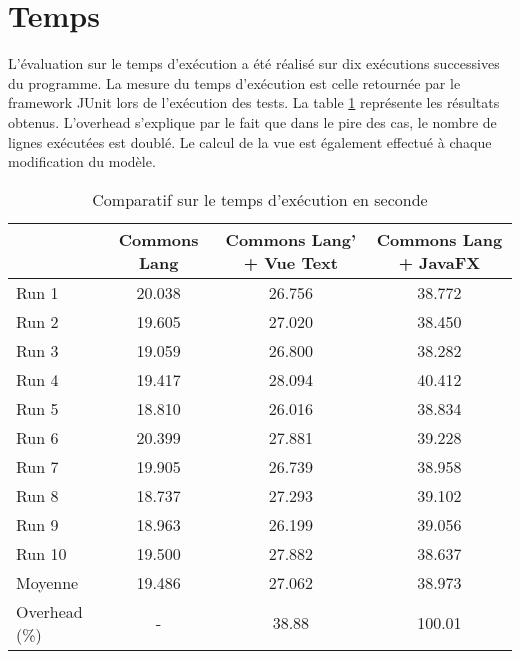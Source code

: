 \section{Temps}
\label{temps}

L'évaluation sur le temps d'exécution a été réalisé sur dix exécutions successives du programme. La mesure du temps d'exécution est celle retournée par le framework JUnit lors de l'exécution des tests. La table \ref{evaluation_temps} représente les résultats obtenus. L'overhead s'explique par le fait que dans le pire des cas, le nombre de lignes exécutées est doublé. Le calcul de la vue est également effectué à chaque modification du modèle.

\begin{table}[H]
\centering
\begin{tabular}{|l|c|c|c|}
\hline
         & Commons Lang & Commons Lang' + Vue Text & Commons Lang + JavaFX\\
         \hline
Run 1     & 20.038  & 26.756       & 38.772        \\
Run 2     & 19.605  & 27.020       & 38.450        \\
Run 3     & 19.059  & 26.800       & 38.282        \\
Run 4     & 19.417  & 28.094       & 40.412        \\
Run 5     & 18.810  & 26.016       & 38.834        \\
Run 6     & 20.399  & 27.881       & 39.228        \\
Run 7     & 19.905  & 26.739       & 38.958        \\
Run 8     & 18.737  & 27.293       & 39.102        \\
Run 9     & 18.963  & 26.199       & 39.056        \\
Run 10    & 19.500  & 27.882       & 38.637        \\
\hline
Moyenne  & 19.486  & 27.062       & 38.973        \\
\hline
Overhead (\%) & -  & 38.88       & 100.01   \\
\hline    
\end{tabular}
\caption{Comparatif sur le temps d'exécution en seconde}
\label{evaluation_temps}
\end{table}
